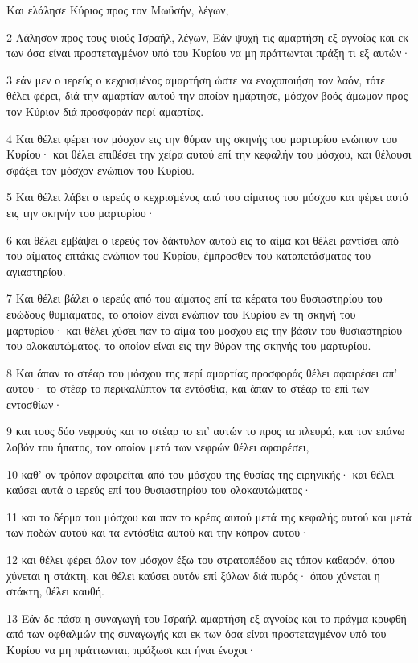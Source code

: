 \par Και ελάλησε Κύριος προς τον Μωϋσήν, λέγων,
\par 2 Λάλησον προς τους υιούς Ισραήλ, λέγων, Εάν ψυχή τις αμαρτήση εξ αγνοίας και εκ των όσα είναι προστεταγμένον υπό του Κυρίου να μη πράττωνται πράξη τι εξ αυτών·
\par 3 εάν μεν ο ιερεύς ο κεχρισμένος αμαρτήση ώστε να ενοχοποιήση τον λαόν, τότε θέλει φέρει, διά την αμαρτίαν αυτού την οποίαν ημάρτησε, μόσχον βοός άμωμον προς τον Κύριον διά προσφοράν περί αμαρτίας.
\par 4 Και θέλει φέρει τον μόσχον εις την θύραν της σκηνής του μαρτυρίου ενώπιον του Κυρίου· και θέλει επιθέσει την χείρα αυτού επί την κεφαλήν του μόσχου, και θέλουσι σφάξει τον μόσχον ενώπιον του Κυρίου.
\par 5 Και θέλει λάβει ο ιερεύς ο κεχρισμένος από του αίματος του μόσχου και φέρει αυτό εις την σκηνήν του μαρτυρίου·
\par 6 και θέλει εμβάψει ο ιερεύς τον δάκτυλον αυτού εις το αίμα και θέλει ραντίσει από του αίματος επτάκις ενώπιον του Κυρίου, έμπροσθεν του καταπετάσματος του αγιαστηρίου.
\par 7 Και θέλει βάλει ο ιερεύς από του αίματος επί τα κέρατα του θυσιαστηρίου του ευώδους θυμιάματος, το οποίον είναι ενώπιον του Κυρίου εν τη σκηνή του μαρτυρίου· και θέλει χύσει παν το αίμα του μόσχου εις την βάσιν του θυσιαστηρίου του ολοκαυτώματος, το οποίον είναι εις την θύραν της σκηνής του μαρτυρίου.
\par 8 Και άπαν το στέαρ του μόσχου της περί αμαρτίας προσφοράς θέλει αφαιρέσει απ' αυτού· το στέαρ το περικαλύπτον τα εντόσθια, και άπαν το στέαρ το επί των εντοσθίων·
\par 9 και τους δύο νεφρούς και το στέαρ το επ' αυτών το προς τα πλευρά, και τον επάνω λοβόν του ήπατος, τον οποίον μετά των νεφρών θέλει αφαιρέσει,
\par 10 καθ' ον τρόπον αφαιρείται από του μόσχου της θυσίας της ειρηνικής· και θέλει καύσει αυτά ο ιερεύς επί του θυσιαστηρίου του ολοκαυτώματος·
\par 11 και το δέρμα του μόσχου και παν το κρέας αυτού μετά της κεφαλής αυτού και μετά των ποδών αυτού και τα εντόσθια αυτού και την κόπρον αυτού·
\par 12 και θέλει φέρει όλον τον μόσχον έξω του στρατοπέδου εις τόπον καθαρόν, όπου χύνεται η στάκτη, και θέλει καύσει αυτόν επί ξύλων διά πυρός· όπου χύνεται η στάκτη, θέλει καυθή.
\par 13 Εάν δε πάσα η συναγωγή του Ισραήλ αμαρτήση εξ αγνοίας και το πράγμα κρυφθή από των οφθαλμών της συναγωγής και εκ των όσα είναι προστεταγμένον υπό του Κυρίου να μη πράττωνται, πράξωσι και ήναι ένοχοι·
